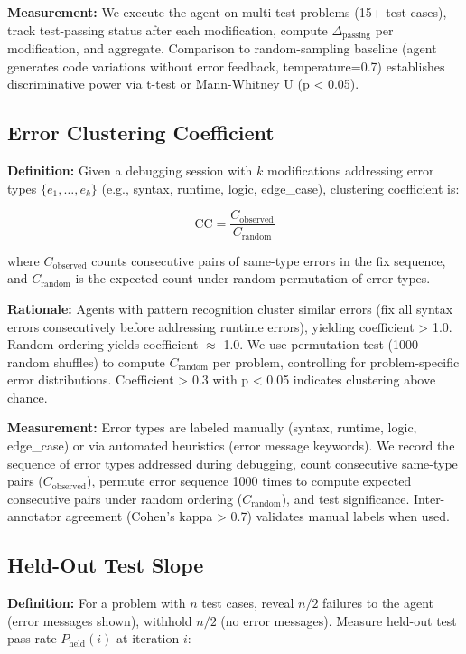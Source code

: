 \textbf{Measurement:} We execute the agent on multi-test problems (15+ test cases), track test-passing status after each modification, compute $\Delta_{\text{passing}}$ per modification, and aggregate. Comparison to random-sampling baseline (agent generates code variations without error feedback, temperature=0.7) establishes discriminative power via t-test or Mann-Whitney U (p < 0.05).

\subsection{Error Clustering Coefficient}

\textbf{Definition:} Given a debugging session with $k$ modifications addressing error types $\{e_1, \ldots, e_k\}$ (e.g., syntax, runtime, logic, edge\_case), clustering coefficient is:

\begin{equation}
\text{CC} = \frac{C_{\text{observed}}}{C_{\text{random}}}
\end{equation}

where $C_{\text{observed}}$ counts consecutive pairs of same-type errors in the fix sequence, and $C_{\text{random}}$ is the expected count under random permutation of error types.

\textbf{Rationale:} Agents with pattern recognition cluster similar errors (fix all syntax errors consecutively before addressing runtime errors), yielding coefficient > 1.0. Random ordering yields coefficient $\approx$ 1.0. We use permutation test (1000 random shuffles) to compute $C_{\text{random}}$ per problem, controlling for problem-specific error distributions. Coefficient > 0.3 with p < 0.05 indicates clustering above chance.

\textbf{Measurement:} Error types are labeled manually (syntax, runtime, logic, edge\_case) or via automated heuristics (error message keywords). We record the sequence of error types addressed during debugging, count consecutive same-type pairs ($C_{\text{observed}}$), permute error sequence 1000 times to compute expected consecutive pairs under random ordering ($C_{\text{random}}$), and test significance. Inter-annotator agreement (Cohen's kappa > 0.7) validates manual labels when used.

\subsection{Held-Out Test Slope}

\textbf{Definition:} For a problem with $n$ test cases, reveal $n/2$ failures to the agent (error messages shown), withhold $n/2$ (no error messages). Measure held-out test pass rate $P_{\text{held}}(i)$ at iteration $i$:

